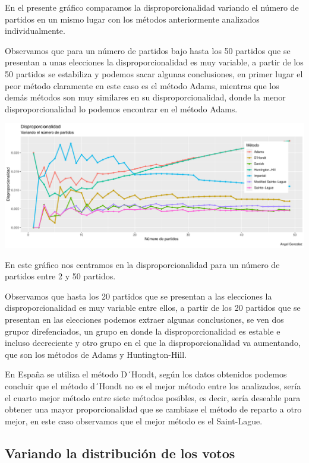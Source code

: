 \documentclass[12pt,a4paper,]{book}
\numberwithin{dummy}{section}
\theoremstyle{ocrenumbox}
\theoremstyle{blacknumex}
\theoremstyle{blacknumbox}
\theoremstyle{ocrenum}
\theoremstyle{ocrenum}
\begin{document}
En el presente gráfico comparamos la disproporcionalidad variando el
número de partidos en un mismo lugar con los métodos anteriormente
analizados individualmente.

Observamos que para un número de partidos bajo hasta los 50 partidos que
se presentan a unas elecciones la disproporcionalidad es muy variable, a
partir de los 50 partidos se estabiliza y podemos sacar algunas
conclusiones, en primer lugar el peor método claramente en este caso es
el método Adams, mientras que los demás métodos son muy similares en su
disproporcionalidad, donde la menor disproporcionalidad lo podemos
encontrar en el método Adams.

\begin{center}\includegraphics[width=0.95\linewidth]{figurasR/unnamed-chunk-45-1} \end{center}

En este gráfico nos centramos en la disproporcionalidad para un número
de partidos entre 2 y 50 partidos.

Observamos que hasta los 20 partidos que se presentan a las elecciones
la disproporcionalidad es muy variable entre ellos, a partir de los 20
partidos que se presentan en las elecciones podemos extraer algunas
conclusiones, se ven dos grupor direfenciados, un grupo en donde la
disproporcionalidad es estable e incluso decreciente y otro grupo en el
que la disproporcionalidad va aumentando, que son los métodos de Adams y
Huntington-Hill.

En España se utiliza el método D´Hondt, según los datos obtenidos
podemos concluir que el método d´Hondt no es el mejor método entre los
analizados, sería el cuarto mejor método entre siete métodos posibles,
es decir, sería deseable para obtener una mayor proporcionalidad que se
cambiase el método de reparto a otro mejor, en este caso observamos que
el mejor método es el Saint-Lague.

\hypertarget{variando-la-distribuciuxf3n-de-los-votos}{%
\subsection{Variando la distribución de los
votos}\label{variando-la-distribuciuxf3n-de-los-votos}}
\end{document}
